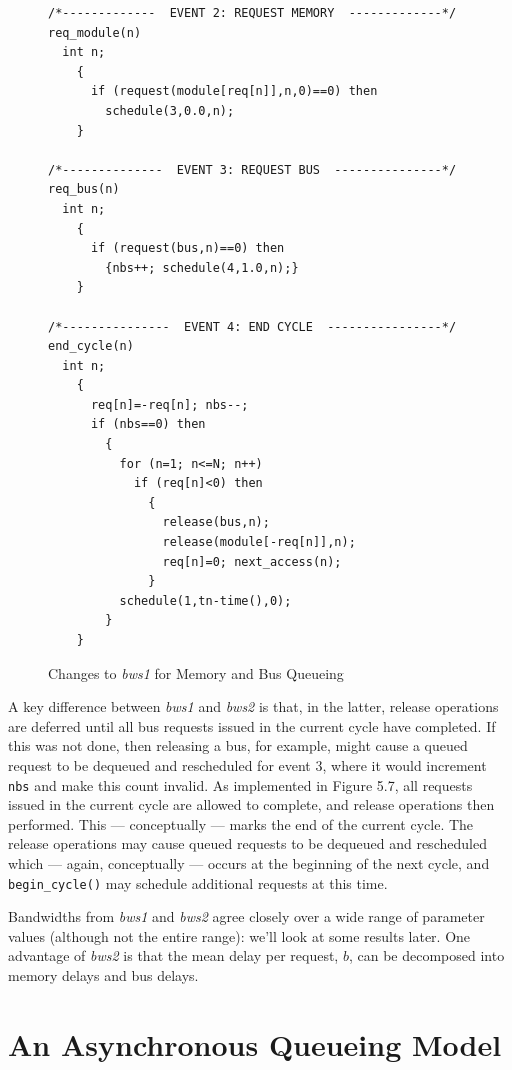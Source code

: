 \begin{figure}[p]
\centering
\begin{minipage}{.95\textwidth}
\begin{lstlisting}[basicstyle=\ttfamily\footnotesize]
/*-------------  EVENT 2: REQUEST MEMORY  -------------*/
req_module(n)
  int n;
    {
      if (request(module[req[n]],n,0)==0) then
        schedule(3,0.0,n);
    }

/*--------------  EVENT 3: REQUEST BUS  ---------------*/
req_bus(n)
  int n;
    {
      if (request(bus,n)==0) then
        {nbs++; schedule(4,1.0,n);}
    }

/*---------------  EVENT 4: END CYCLE  ----------------*/
end_cycle(n)
  int n;
    {
      req[n]=-req[n]; nbs--;
      if (nbs==0) then
        {
          for (n=1; n<=N; n++)
            if (req[n]<0) then
              {
                release(bus,n);
                release(module[-req[n]],n);
                req[n]=0; next_access(n);
              }
          schedule(1,tn-time(),0);
        }
    }
\end{lstlisting}
\end{minipage}
\caption{Changes to \emph{bws1} for Memory and Bus Queueing}
\end{figure}

A key difference between \emph{bws1} and \emph{bws2} is that, in the latter, release
operations are deferred until all bus requests issued in the current cycle have
completed. If this was not done, then releasing a bus, for example, might
cause a queued request to be dequeued and rescheduled for event 3, where it
would increment \texttt{nbs} and make this count invalid. As implemented in
Figure 5.7, all requests issued in the current cycle are allowed to complete,
and release operations then performed. This --- conceptually --- marks the
end of the current cycle. The release operations may cause queued requests to
be dequeued and rescheduled which --- again, conceptually --- occurs at the
beginning of the next cycle, and \texttt{begin\_cycle()} may schedule additional
requests at this time.

Bandwidths from \emph{bws1} and \emph{bws2} agree closely over a wide range of
parameter values (although not the entire range): we'll look at some results
later. One advantage of \emph{bws2} is that the mean delay per request, $b$, can be
decomposed into memory delays and bus delays.

\section{An Asynchronous Queueing Model}

